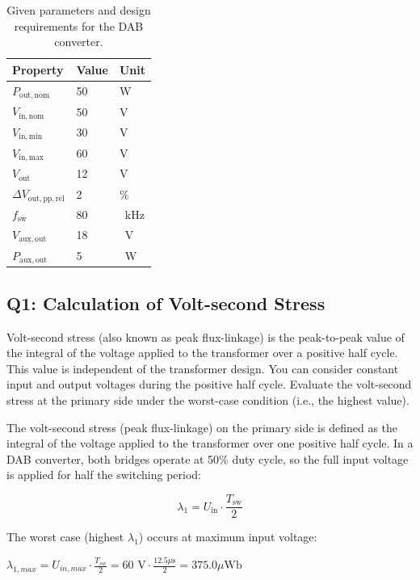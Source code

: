 \documentclass{PELsmallreport}
\begin{document}
\begin{table}[H]
\caption{Given parameters and design requirements for the DAB converter.}
\centering
\label{Tab:Specs}
    \begin{tabular}{|l|l|l|}
      \hline
      \textbf{Property} & \textbf{Value} & \textbf{Unit} \\
      \hline
      $P_\mathrm{out,nom}$ & 50 & \si{\watt} \\ \hline
      $V_\mathrm{in,nom}$ & 50 & \si{\volt} \\ \hline
      $V_\mathrm{in,min}$ & 30  & \si{\volt} \\ \hline
      $V_\mathrm{in,max}$ & 60 & \si{\volt} \\ \hline  
      $V_\mathrm{out}$ & 12 & \si{\volt} \\ \hline
      $\Delta V_\mathrm{out,pp,rel}$ & 2 & \% \\ \hline
      $f_\mathrm{sw}$ & 80 & \qty{}{\kHz} \\ \hline
      $V_\mathrm{aux,out} $ & \qty{18}{} & \qty{}{\V} \\ \hline
      $P_\mathrm{aux,out} $ & \qty{5}{} & \qty{}{\W} \\ \hline
    \end{tabular}
\end{table}







\newpage
\subsection{Q1: Calculation of Volt-second Stress} 
Volt-second stress (also known as peak flux-linkage) is the peak-to-peak value of the integral of the voltage applied to the transformer over a positive half cycle. 
This value is independent of the transformer design.  
You can consider constant input and output voltages during the positive half cycle. 
Evaluate the volt-second stress at the primary side under the worst-case condition (i.e., the highest value). 
\\




\begin{framed}
	\vspace{2em}
	The volt-second stress (peak flux-linkage) on the primary side is defined as the integral of the voltage applied to the transformer over one positive half cycle. In a DAB converter, both bridges operate at 50\% duty cycle, so the full input voltage is applied for half the switching period:

$$\lambda_1 = U_\mathrm{in} \cdot \frac{T_\mathrm{sw}}{2}$$

The worst case (highest $\lambda_1$) occurs at maximum input voltage:

$\lambda_{1,max} = U_{in,max} \cdot \frac{ T_{sw}}{2} = 60 \text{ V} \cdot\frac{ 12.5 \mu\text{s}}{2} = 375.0 \mu\text{Wb}$
	\vspace{2em}
\end{framed}
\end{document}
